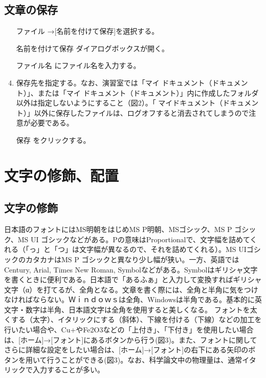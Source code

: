 \subsection{文章の保存}
\begin{enumerate}
\item [ファイル]→[名前を付けて保存]を選択する。
\item [名前を付けて保存]ダイアログボックスが開く。
\item [ファイル名]にファイル名を入力する。
\item 保存先を指定する。なお、演習室では「マイ ドキュメント（ドキュメント）」、または「マイ ドキュメント（ドキュメント）」内に作成したフォルダ以外は指定しないようにすること（図2）。「
マイドキュメント（ドキュメント）」以外に保存したファイルは、ログオフすると消去されてしまうので注意が必要である。
\item [保存]をクリックする。
\end{enumerate}

\section{文字の修飾、配置}
\subsection{文字の修飾}
日本語のフォントにはMS明朝をはじめMS P明朝、MSゴシック、MS P ゴシック、MS UI ゴシックなどがある。Pの意味はProportionalで、文字幅を詰めてくれる（「っ」と「つ」は文字幅が異なるので、それを詰めてくれる）。MS UIゴシックのカタカナはMS P ゴシックと異なり少し幅が狭い。一方、英語ではCentury, Arial, Times New Roman, Symbolなどがある。Symbolはギリシャ文字を書くときに便利である。日本語で「あるふぁ」と入力して変換すればギリシャ文字（α）を打てるが、全角となる。文章を書く際には、全角と半角に気をつけなければならない。Ｗｉｎｄｏｗｓは全角、Windowsは半角である。基本的に英文字・数字は半角、日本語文字は全角を使用すると美しくなる。
フォントを太くする（太字）、イタリックにする（斜体）、下線を付ける（下線）などの加工を行いたい場合や、Cu+やFe2O3などの「上付き」、「下付き」を使用したい場合は、[ホーム]→[フォント]にあるボタンから行う(図3)。また、フォントに関してさらに詳細な設定をしたい場合は、[ホーム]→[フォント]の右下にある矢印のボタンを用いて行うことができる(図3)。なお、科学論文中の物理量は、通常イタリックで入力することが多い。

